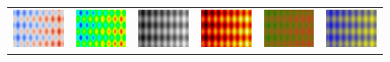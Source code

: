\documentclass[review,journal]{vgtc}         %
\begin{document}
\begin{figure}
\begin{tabular}{c@{\;}c@{\;}c@{\;}c@{\;}c@{\;}c}
    \includegraphics[width=1.1in]{images/Cool2WarmLfSensitivity} &
    \includegraphics[width=1.1in]{images/RainbowLfSensitivity} &
    \includegraphics[width=1.1in]{images/GrayscaleLfSensitivity} &
    \includegraphics[width=1.1in]{images/BlackBodyLfSensitivity} &
    \includegraphics[width=1.1in]{images/Green2RedLfSensitivity} &
    \includegraphics[width=1.1in]{images/Blue2YellowLfSensitivity} \\


\end{tabular}
\end{figure}
\end{document}
